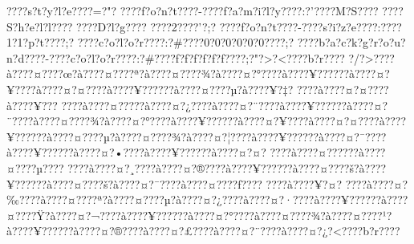 \documentclass[11pt, openany]{book}
\begin{document}
???\textbar{}?s?t?y?l?e???\textbar{}?=?"?
???\textbar{}?f?o?n?t???\textbar{}?-???\textbar{}?f?a?m?i?l?y???\textbar{}?:?'???\textbar{}?M?S???\textbar{}?
???\textbar{}?S?h?e?l?l???\textbar{}? ???\textbar{}?D?l?g???\textbar{}?
???\textbar{}?2???\textbar{}?'?;?
???\textbar{}?f?o?n?t???\textbar{}?-???\textbar{}?s?i?z?e???\textbar{}?:???\textbar{}?1?1?p?t???\textbar{}?;?
???\textbar{}?c?o?l?o?r???\textbar{}?:?\#???\textbar{}?0?0?0?0?0?0???\textbar{}?;?
???\textbar{}?b?a?c?k?g?r?o?u?n?d???\textbar{}?-???\textbar{}?c?o?l?o?r???\textbar{}?:?\#???\textbar{}?f?f?f?f?f?f???\textbar{}?;?"?\textgreater{}?\textless{}???\textbar{}?b?r???\textbar{}?
?/?\textgreater{}???\textbar{}?à???\textbar{}?¤???\textbar{}?œ?à???\textbar{}?¤???\textbar{}?ª?à???\textbar{}?¤???\textbar{}?¾?à???\textbar{}?¤?°???\textbar{}?à???\textbar{}?¥?????\textbar{}?à???\textbar{}?¤?¥???\textbar{}?à???\textbar{}?¤?¤???\textbar{}?à???\textbar{}?¥?????\textbar{}?à???\textbar{}?¤???\textbar{}?µ?à???\textbar{}?¥?‡?
???\textbar{}?à???\textbar{}?¤?¤???\textbar{}?à???\textbar{}?¥???
???\textbar{}?à???\textbar{}?¤?­???\textbar{}?à???\textbar{}?¤?¿???\textbar{}?à???\textbar{}?¤?¨???\textbar{}?à???\textbar{}?¥?????\textbar{}?à???\textbar{}?¤?¨???\textbar{}?à???\textbar{}?¤???\textbar{}?¾?à???\textbar{}?¤?°???\textbar{}?à???\textbar{}?¥?????\textbar{}?à???\textbar{}?¤?¥???\textbar{}?à???\textbar{}?¤?¤???\textbar{}?à???\textbar{}?¥?????\textbar{}?à???\textbar{}?¤???\textbar{}?µ?à???\textbar{}?¤???\textbar{}?¾?à???\textbar{}?¤?¦???\textbar{}?à???\textbar{}?¥?????\textbar{}?à???\textbar{}?¤?¯???\textbar{}?à???\textbar{}?¥?????\textbar{}?à???\textbar{}?¤?•???\textbar{}?à???\textbar{}?¥?????\textbar{}?à???\textbar{}?¤?¤?
???\textbar{}?à???\textbar{}?¤?????\textbar{}?à???\textbar{}?¤???\textbar{}?µ???\textbar{}?
???\textbar{}?à???\textbar{}?¤?¸???\textbar{}?à???\textbar{}?¤?®???\textbar{}?à???\textbar{}?¥?????\textbar{}?à???\textbar{}?¤???\textbar{}?š?à???\textbar{}?¥?????\textbar{}?à???\textbar{}?¤???\textbar{}?š?à???\textbar{}?¤?¯???\textbar{}?à???\textbar{}?¤???\textbar{}?ƒ???\textbar{}?
???\textbar{}?à???\textbar{}?¥?¤?
???\textbar{}?à???\textbar{}?¤?‰???\textbar{}?à???\textbar{}?¤???\textbar{}?ª?à???\textbar{}?¤???\textbar{}?µ?à???\textbar{}?¤?¿???\textbar{}?à???\textbar{}?¤?·???\textbar{}?à???\textbar{}?¥?????\textbar{}?à???\textbar{}?¤???\textbar{}?Ÿ?à???\textbar{}?¤?¬???\textbar{}?à???\textbar{}?¥?????\textbar{}?à???\textbar{}?¤?°???\textbar{}?à???\textbar{}?¤???\textbar{}?¾?à???\textbar{}?¤???\textbar{}?¹?à???\textbar{}?¥?????\textbar{}?à???\textbar{}?¤?®???\textbar{}?à???\textbar{}?¤?£???\textbar{}?à???\textbar{}?¤?¨???\textbar{}?à???\textbar{}?¤?¿?\textless{}???\textbar{}?b?r???\textbar{}?
\end{document}
